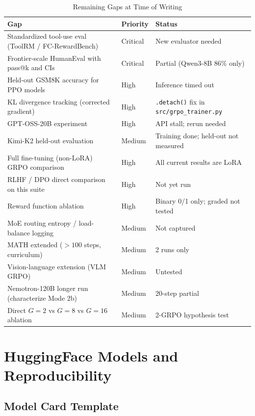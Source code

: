 \documentclass[12pt,a4paper]{report}
\theoremstyle{definition}
\begin{document}
\begin{table}[htbp]
\centering
\caption{Remaining Gaps at Time of Writing}
\label{tab:open-gaps}
\footnotesize
\begin{tabular}{p{7cm}lp{4.5cm}}
\toprule
\textbf{Gap} & \textbf{Priority} & \textbf{Status} \\
\midrule
Standardized tool-use eval (ToolRM / FC-RewardBench) & Critical & New evaluator needed \\
Frontier-scale HumanEval with pass@k and CIs & Critical & Partial (Qwen3-8B 86\% only) \\
Held-out GSM8K accuracy for PPO models & High & Inference timed out \\
KL divergence tracking (corrected gradient) & High & \texttt{.detach()} fix in \texttt{src/grpo\_trainer.py} \\
GPT-OSS-20B experiment & High & API stall; rerun needed \\
Kimi-K2 held-out evaluation & Medium & Training done; held-out not measured \\
Full fine-tuning (non-LoRA) GRPO comparison & High & All current results are LoRA \\
RLHF / DPO direct comparison on this suite & High & Not yet run \\
Reward function ablation & High & Binary 0/1 only; graded not tested \\
MoE routing entropy / load-balance logging & Medium & Not captured \\
MATH extended ($>100$ steps, curriculum) & Medium & 2 runs only \\
Vision-language extension (VLM GRPO) & Medium & Untested \\
Nemotron-120B longer run (characterize Mode 2b) & Medium & 20-step partial \\
Direct $G{=}2$ vs $G{=}8$ vs $G{=}16$ ablation & Medium & 2-GRPO hypothesis test \\
\bottomrule
\end{tabular}
\end{table}


\chapter{HuggingFace Models and Reproducibility}
\label{ch:hf-repro}

\section{Model Card Template}
\label{sec:model-card}
\end{document}
